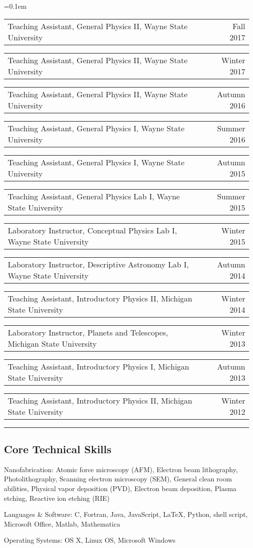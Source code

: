 \documentclass[10pt,letterpaper]{article}
\makeatletter
\newenvironment{indentsection}[1]%
{\begin{list}{}%
	{\setlength{\leftmargin}{#1}}%
	\item[]%
}
{\end{list}}
\newcommand{\headerrow}[2]
{\begin{tabular*}{\linewidth}{l@{\extracolsep{\fill}}r}
	#1 &
	#2 \\
\end{tabular*}}
\newcommand{\CPP}
{C\nolinebreak[4]\hspace{-.05em}\raisebox{.22ex}{\footnotesize\bf ++}}
\makeatother
\begin{document}
\begin{itemize*}
	\parskip=0.1em
	\item[]
	\headerrow
		{Teaching Assistant, General Physics II, Wayne State University}
		{Fall 2017}
	\item[]
	\headerrow
		{Teaching Assistant, General Physics II, Wayne State University}
		{Winter 2017}
	\item[]
	\headerrow
		{Teaching Assistant, General Physics II, Wayne State University}
		{Autumn 2016}
	\item[]
	\headerrow
		{Teaching Assistant, General Physics I, Wayne State University}
		{Summer 2016}
	\item[]
	\headerrow
		{Teaching Assistant, General Physics I, Wayne State University}
		{Autumn 2015}	
	\item[]
	\headerrow
		{Teaching Assistant, General Physics Lab I, Wayne State University}
		{Summer 2015}
	\item[]
	\headerrow
		{Laboratory Instructor, Conceptual Physics Lab I, Wayne State University}
		{Winter 2015}
	\item[]
	\headerrow
		{Laboratory Instructor, Descriptive Astronomy Lab I, Wayne State University}
		{Autumn 2014}
	\item[]
	\headerrow
		{Teaching Assistant, Introductory Physics II, Michigan State University}
		{Winter 2014}
	\item[]
	\headerrow
		{Laboratory Instructor, Planets and Telescopes, Michigan State University}
		{Winter 2013}
	\item[]
	\headerrow
		{Teaching Assistant, Introductory Physics I, Michigan State University}
		{Autumn 2013}
	\item[]
	\headerrow
		{Teaching Assistant, Introductory Physics II, Michigan State University}
		{Winter 2012}
\end{itemize*}

\hrule
\vspace{-0.4em}
\subsection*{Core Technical Skills}

\begin{indentsection}{\parindent}
\begin{description*}
	\item[Nanofabrication:]
	Atomic force microscopy (AFM), Electron beam lithography, Photolithography, Scanning electron microscopy (SEM), General clean room abilities, Physical vapor deposition (PVD), Electron beam deposition, Plasma etching, Reactive ion etching (RIE)
	\item[Languages \& Software:]
	\CPP, Fortran, Java, JavaScript, \LaTeX, Python, shell script, Microsoft Office, Matlab, Mathematica
	\item[Operating Systems:]
	OS X, Linux OS, Microsoft Windows
\end{description*}
\end{indentsection}
\end{document}
